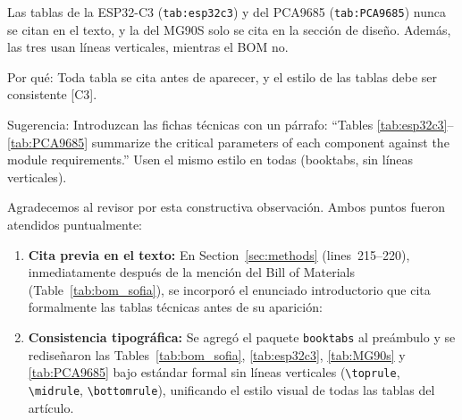 \documentclass{LabDSTresponse}
\begin{document}
{Las tablas de la ESP32-C3 (\texttt{tab:esp32c3}) y del PCA9685 (\texttt{tab:PCA9685}) nunca se citan en el texto, y la del MG90S solo se cita en la sección de diseño. Además, las tres usan líneas verticales, mientras el BOM no.

Por qué: Toda tabla se cita antes de aparecer, y el estilo de las tablas debe ser consistente [C3].

Sugerencia: Introduzcan las fichas técnicas con un párrafo: “Tables \ref{tab:esp32c3}–\ref{tab:PCA9685} summarize the critical parameters of each component against the module requirements.” Usen el mismo estilo en todas (booktabs, sin líneas verticales).}
{Agradecemos al revisor por esta constructiva observación. Ambos puntos fueron atendidos puntualmente:
\begin{enumerate}
    \item \textbf{Cita previa en el texto:} En Section~\ref{sec:methods} (lines~215--220), inmediatamente después de la mención del Bill of Materials (Table~\ref{tab:bom_sofia}), se incorporó el enunciado introductorio que cita formalmente las tablas técnicas antes de su aparición:
    \item \textbf{Consistencia tipográfica:} Se agregó el paquete \texttt{booktabs} al preámbulo y se rediseñaron las Tables~\ref{tab:bom_sofia}, \ref{tab:esp32c3}, \ref{tab:MG90s} y \ref{tab:PCA9685} bajo estándar formal sin líneas verticales (\texttt{\textbackslash toprule}, \texttt{\textbackslash midrule}, \texttt{\textbackslash bottomrule}), unificando el estilo visual de todas las tablas del artículo.
\end{enumerate}}
\end{document}
